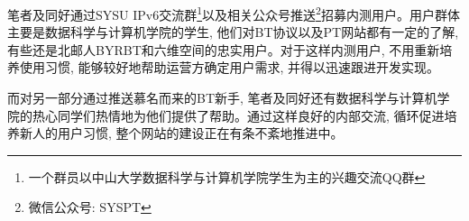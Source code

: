 笔者及同好通过SYSU IPv6交流群\footnote{一个群员以中山大学数据科学与计算机学院学生为主的兴趣交流QQ群}以及相关公众号推送\footnote{微信公众号: SYSPT}招募内测用户。用户群体主要是数据科学与计算机学院的学生, 他们对BT协议以及PT网站都有一定的了解, 有些还是北邮人BYRBT和六维空间的忠实用户。对于这样内测用户, 不用重新培养使用习惯, 能够较好地帮助运营方确定用户需求, 并得以迅速跟进开发实现。

而对另一部分通过推送慕名而来的BT新手, 笔者及同好还有数据科学与计算机学院的热心同学们热情地为他们提供了帮助。通过这样良好的内部交流, 循环促进培养新人的用户习惯, 整个网站的建设正在有条不紊地推进中。
